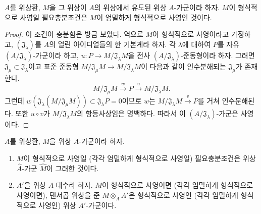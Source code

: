 \begin{proposition}[19.2.4]
\label{0.19.2.4-fr}
$A$를 위상환, $M$을 그 위상이 $A$의 위상에서 유도된 위상
$A$-가군이라 하자. $M$이 형식적으로 사영일 필요충분조건은 $M$이
엄밀하게 형식적으로 사영인 것이다.
\end{proposition}


\begin{proof}
이 조건이 충분함은 방금 보았다. 역으로 $M$이 형식적으로 사영이라고
가정하고, $(\mathfrak J_\lambda)$를 $A$의 열린 아이디얼들의 한
기본계라 하자. 각 $\lambda$에 대하여 $P$를 자유
$(A/\mathfrak J_\lambda)$-가군이라 하고,
$u:P\to M/\mathfrak J_\lambda M$을 전사
$(A/\mathfrak J_\lambda)$-준동형이라 하자. 그러면
$\mathfrak J_\mu\subset\mathfrak J_\lambda$이고 표준 준동형
$M/\mathfrak J_\mu M\to M/\mathfrak J_\lambda M$이 다음과 같이
인수분해되는 $\mathfrak J_\mu$가 존재한다.
\[
  M/\mathfrak J_\mu M\xrightarrow{w}P\xrightarrow{u}
  M/\mathfrak J_\lambda M.
\]
그런데
$w(\mathfrak J_\lambda(M/\mathfrak J_\mu M))
\subset\mathfrak J_\lambda P=0$이므로 $w$는
$M/\mathfrak J_\lambda M\xrightarrow{v}P$를 거쳐 인수분해된다.
또한 $u\circ v$가 $M/\mathfrak J_\lambda M$의 항등사상임은 명백하다.
따라서 이 $(A/\mathfrak J_\lambda)$-가군은 사영이다.
\end{proof}

\begin{proposition}[19.2.5]
\label{0.19.2.5-fr}
$A$를 위상환, $M$을 위상 $A$-가군이라 하자.
\begin{enumerate}
  \item[(i)] $M$이 형식적으로 사영일 (각각 엄밀하게 형식적으로
  사영일) 필요충분조건은 위상 $\widehat A$-가군 $\widehat M$이
  그러한 것이다.
  \item[(ii)] $A'$을 위상 $A$-대수라 하자. $M$이 형식적으로
  사영이면 (각각 엄밀하게 형식적으로 사영이면), 텐서곱 위상을 준
  $M\otimes_A A'$은 형식적으로 사영인 (각각 엄밀하게 형식적으로
  사영인) 위상 $A'$-가군이다.
\end{enumerate}
\end{proposition}

